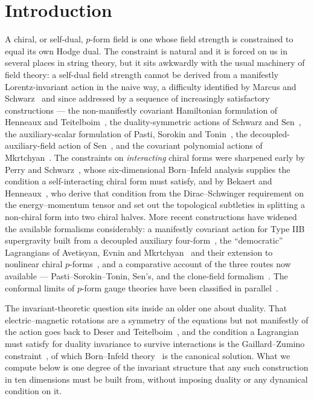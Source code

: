 \documentclass[11pt,a4paper]{article}
\theoremstyle{definition}
\theoremstyle{remark}
\begin{document}
\section{Introduction}
\label{sec:intro}

A chiral, or self-dual, $p$-form field is one whose field strength is
constrained to equal its own Hodge dual. The constraint is natural and it is
forced on us in several places in string theory, but it sits awkwardly with the
usual machinery of field theory: a self-dual field strength cannot be derived
from a manifestly Lorentz-invariant action in the naive way, a difficulty
identified by Marcus and Schwarz~\cite{Marcus:1982yu} and since addressed by a
sequence of increasingly satisfactory constructions --- the non-manifestly
covariant Hamiltonian formulation of Henneaux and
Teitelboim~\cite{Henneaux:1988gg}, the duality-symmetric actions of Schwarz and
Sen~\cite{Schwarz:1993vs}, the auxiliary-scalar formulation of Pasti,
Sorokin and Tonin~\cite{Pasti:1995tn,Pasti:1997gx}, the decoupled-auxiliary-field
action of Sen~\cite{Sen:2019qit}, and the covariant polynomial actions of
Mkrtchyan~\cite{Mkrtchyan:2019wnk}. The constraints on \emph{interacting} chiral
forms were sharpened early by Perry and Schwarz~\cite{Perry:1996mk}, whose
six-dimensional Born--Infeld analysis supplies the condition a self-interacting
chiral form must satisfy, and by Bekaert and Henneaux~\cite{Bekaert:1998yp}, who
derive that condition from the Dirac--Schwinger requirement on the
energy--momentum tensor and set out the topological subtleties in splitting a
non-chiral form into two chiral halves. More recent constructions have widened
the available formalisms considerably: a manifestly covariant action for Type
IIB supergravity built from a decoupled auxiliary four-form~\cite{Sen:2015nph},
the ``democratic'' Lagrangians of Avetisyan, Evnin and
Mkrtchyan~\cite{Avetisyan:2021heg} and their extension to nonlinear chiral
$p$-forms~\cite{Avetisyan:2022zza}, and a comparative account of the three
routes now available --- Pasti--Sorokin--Tonin, Sen's, and the clone-field
formalism~\cite{Evnin:2022kqf}. The conformal limits of $p$-form gauge theories
have been classified in parallel~\cite{Bandos:2020jsw}.

The invariant-theoretic question sits inside an older one about duality. That
electric--magnetic rotations are a symmetry of the equations but not manifestly
of the action goes back to Deser and Teitelboim~\cite{Deser:1976iy}, and the
condition a Lagrangian must satisfy for duality invariance to survive
interactions is the Gaillard--Zumino
constraint~\cite{Gaillard:1981rj,Gibbons:1995cv}, of which Born--Infeld
theory~\cite{Born:1934gh} is the canonical solution. What we compute below is
one degree of the invariant structure that any such construction in ten
dimensions must be built from, without imposing duality or any dynamical
condition on it.
\end{document}
